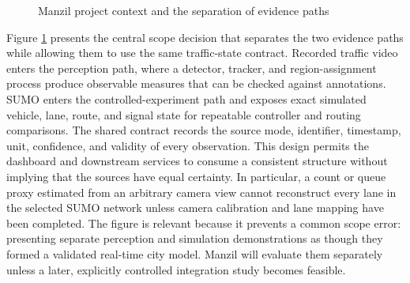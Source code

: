 \begin{figure}[htbp]
\centering
{}
\caption{Manzil project context and the separation of evidence paths}
\label{fig:context}
\end{figure}

Figure \ref{fig:context} presents the central scope decision that separates the two evidence paths while allowing them to use the same traffic-state contract. Recorded traffic video enters the perception path, where a detector, tracker, and region-assignment process produce observable measures that can be checked against annotations. SUMO enters the controlled-experiment path and exposes exact simulated vehicle, lane, route, and signal state for repeatable controller and routing comparisons. The shared contract records the source mode, identifier, timestamp, unit, confidence, and validity of every observation. This design permits the dashboard and downstream services to consume a consistent structure without implying that the sources have equal certainty. In particular, a count or queue proxy estimated from an arbitrary camera view cannot reconstruct every lane in the selected SUMO network unless camera calibration and lane mapping have been completed. The figure is relevant because it prevents a common scope error: presenting separate perception and simulation demonstrations as though they formed a validated real-time city model. Manzil will evaluate them separately unless a later, explicitly controlled integration study becomes feasible.

